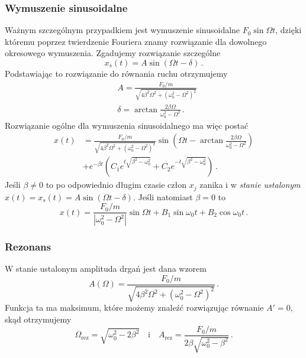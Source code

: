 \documentclass[../main.tex]{subfiles}
\begin{document}
    \subsubsection*{Wymuszenie sinusoidalne}
    Ważnym szczególnym przypadkiem jest wymuszenie sinusoidalne \(F_0\sin\Omega t\), dzięki któremu poprzez twierdzenie Fouriera znamy rozwiązanie dla dowolnego okresowego wymuszenia. Zgadujemy rozwiązanie szczególne
    \begin{equation*}
        x_s(t)=A\sin(\Omega t-\delta)\,.
    \end{equation*}
    Podstawiając to rozwiązanie do równania ruchu otrzymujemy
    \begin{equation*}
    \begin{split}
        &A=\frac{F_0/m}{\sqrt{4\beta^2\Omega^2+(\omega_0^2-\Omega^2)^2}}\\
        &\delta=\arctan\frac{2\beta\Omega}{\omega_0^2-\Omega^2}\,.
    \end{split}
    \end{equation*}
    Rozwiązanie ogólne dla wymuszenia sinusoidalnego ma więc postać
    \begin{equation*}
    \begin{split}
        x(t)&=\frac{F_0/m}{\sqrt{4\beta^2\Omega^2+(\omega_0^2-\Omega^2)^2}}\sin\left(\Omega t-\arctan\frac{2\beta\Omega}{\omega_0^2-\Omega^2}\right)\\
        &+e^{-\beta t}\left(C_1e^{t\sqrt{\beta^2-\omega_0^2}}+C_2e^{-t\sqrt{\beta^2-\omega_0^2}}\right)\,.
    \end{split}
    \end{equation*}
    Jeśli \(\beta\neq0\) to po odpowiednio długim czasie człon \(x_j\) zanika i w \textit{stanie ustalonym} \(x(t)=x_s(t)=A\sin(\Omega t-\delta)\). Jeśli natomiast \(\beta=0\) to
    \begin{equation*}
        x(t)=\frac{F_0/m}{|\omega_0^2-\Omega^2|}\sin\Omega t+B_1\sin\omega_0t+B_2\cos\omega_0t\,.
    \end{equation*}
    \subsubsection{Rezonans}
    W stanie ustalonym amplituda drgań jest dana wzorem
    \begin{equation*}
        A(\Omega)=\frac{F_0/m}{\sqrt{4\beta^2\Omega^2+(\omega_0^2-\Omega^2)^2}}\,.
    \end{equation*}
    Funkcja ta ma maksimum, które możemy znaleźć rozwiązując równanie \(A'=0\), skąd otrzymujemy
    \begin{equation*}
        \Omega_\text{rez}=\sqrt{\omega_0^2-2\beta^2}\quad\text{i}\quad A_\text{rez}=\frac{F_0/m}{2\beta\sqrt{\omega_0^2-\beta^2}}\,.
    \end{equation*}
\end{document}

